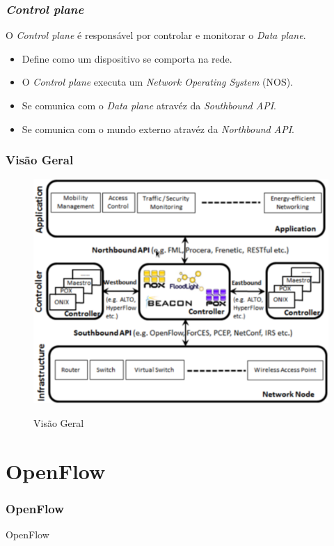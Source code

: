 \documentclass{beamer}
\begin{document}
\begin{frame}
    \frametitle{\textit{Control plane}}

    O \textit{Control plane} é responsável por controlar e monitorar o \textit{Data plane}.

    \begin{itemize}
        \item Define como um dispositivo se comporta na rede.
        \item O \textit{Control plane} executa um \textit{Network Operating System} (NOS).
        \item Se comunica com o \textit{Data plane} atravéz da \textit{Southbound API}.
        \item Se comunica com o mundo externo atravéz da \textit{Northbound API}.
    \end{itemize}
\end{frame}

\begin{frame}
    \frametitle{Visão Geral}

    \begin{figure}
        \centering
        \includegraphics[width=0.75\linewidth]{sdnARCH}
        \label{hue}
        \caption{Visão Geral}
    \end{figure}

\end{frame}

\section{OpenFlow}

\begin{frame}
    \frametitle{OpenFlow}

    \begin{center}
        {\huge{OpenFlow}}
    \end{center}

\end{frame}
\end{document}
